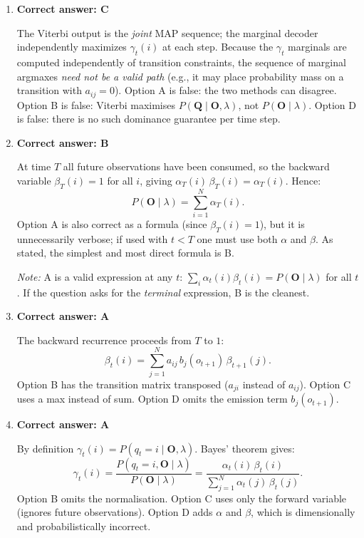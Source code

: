 \documentclass[12pt]{article}
\begin{document}
\begin{enumerate}[label=\textbf{Q\arabic*.}, leftmargin=*, itemsep=1.5em]
\item \textbf{Correct answer: C}

The Viterbi output is the \emph{joint} MAP sequence; the marginal decoder
independently maximizes $\gamma_t(i)$ at each step.  Because the $\gamma_t$
marginals are computed independently of transition constraints, the sequence of
marginal argmaxes \emph{need not be a valid path}
(e.g., it may place probability mass on a transition with $a_{ij}=0$).
Option A is false: the two methods can disagree.
Option B is false: Viterbi maximises $P(\mathbf{Q}\mid\mathbf{O},\lambda)$,
not $P(\mathbf{O}\mid\lambda)$.
Option D is false: there is no such dominance guarantee per time step.

\item \textbf{Correct answer: B}

At time $T$ all future observations have been consumed, so the backward variable
$\beta_T(i) = 1$ for all $i$, giving
$\alpha_T(i)\,\beta_T(i) = \alpha_T(i)$.  Hence:
\[
    P(\mathbf{O}\mid\lambda) = \sum_{i=1}^{N} \alpha_T(i).
\]
Option A is also correct as a formula (since $\beta_T(i)=1$), but it is
unnecessarily verbose; if used with $t < T$ one must use both $\alpha$ and
$\beta$.  As stated, the simplest and most direct formula is B.

\textit{Note:} A is a valid expression at any $t$:
$\sum_i \alpha_t(i)\beta_t(i) = P(\mathbf{O}\mid\lambda)$ for all $t$.
If the question asks for the \emph{terminal} expression, B is the cleanest.

\item \textbf{Correct answer: A}

The backward recurrence proceeds from $T$ to $1$:
\[
    \beta_t(i) = \sum_{j=1}^{N} a_{ij}\, b_j(o_{t+1})\,\beta_{t+1}(j).
\]
Option B has the transition matrix transposed ($a_{ji}$ instead of $a_{ij}$).
Option C uses a max instead of sum.
Option D omits the emission term $b_j(o_{t+1})$.

\item \textbf{Correct answer: A}

By definition $\gamma_t(i) = P(q_t=i\mid\mathbf{O},\lambda)$. Bayes' theorem gives:
\[
    \gamma_t(i)
    = \frac{P(q_t=i,\mathbf{O}\mid\lambda)}{P(\mathbf{O}\mid\lambda)}
    = \frac{\alpha_t(i)\,\beta_t(i)}
           {\displaystyle\sum_{j=1}^{N}\alpha_t(j)\,\beta_t(j)}.
\]
Option B omits the normalisation.
Option C uses only the forward variable (ignores future observations).
Option D adds $\alpha$ and $\beta$, which is dimensionally and probabilistically incorrect.


\end{enumerate}
\end{document}
